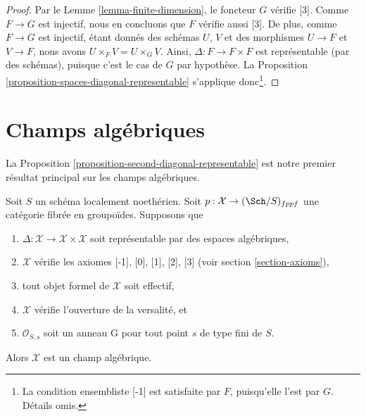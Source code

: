 \begin{proof}
Par le Lemme \ref{lemma-finite-dimension}, le foncteur $G$ vérifie [3].
Comme $F \to G$ est injectif, nous en concluons que $F$ vérifie aussi [3].
De plus, comme $F \to G$ est injectif, étant donnés des schémas
$U$, $V$ et des morphismes $U \to F$ et $V \to F$, nous avons
$U \times_F V = U \times_G V$. Ainsi, $\Delta : F \to F \times F$ est
représentable (par des schémas), puisque c'est le cas de $G$ par hypothèse.
La Proposition \ref{proposition-spaces-diagonal-representable}
s'applique donc\footnote{La condition
ensembliste [-1] est satisfaite par $F$, puisqu'elle l'est par $G$. Détails
omis.}.
\end{proof}












\section{Champs algébriques}
\label{section-algebraic-stacks}

\noindent
La Proposition \ref{proposition-second-diagonal-representable} est notre premier
résultat principal sur les champs algébriques.

\begin{lemma}
\label{lemma-diagonal-representable}
Soit $S$ un schéma localement noethérien. Soit
$p : \mathcal{X} \to (\Sch/S)_{fppf}$ une catégorie fibrée en groupoïdes.
Supposons que
\begin{enumerate}
\item $\Delta : \mathcal{X} \to \mathcal{X} \times \mathcal{X}$
soit représentable par des espaces algébriques,
\item $\mathcal{X}$ vérifie les axiomes [-1], [0], [1], [2], [3] (voir
section \ref{section-axioms}),
\item tout objet formel de $\mathcal{X}$ soit effectif,
\item $\mathcal{X}$ vérifie l'ouverture de la versalité, et
\item $\mathcal{O}_{S, s}$ soit un anneau G pour tout point $s$ de type fini de $S$.
\end{enumerate}
Alors $\mathcal{X}$ est un champ algébrique.
\end{lemma}

